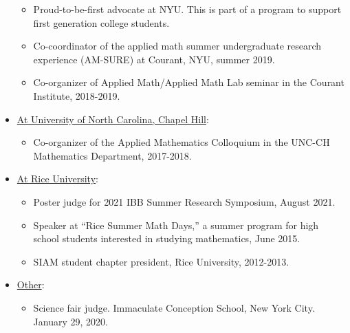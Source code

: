 \documentclass{article} %
\begin{document}
\begin{itemize}
\begin{itemize}
\item Proud-to-be-first advocate at NYU.  This is part of a program to support first generation college students.\item Co-coordinator of the applied math summer undergraduate research experience (AM-SURE) at Courant, NYU, summer 2019.
\item Co-organizer of Applied Math/Applied Math Lab seminar in the Courant Institute, 2018-2019.
\end{itemize}
\item \underline{At University of North Carolina, Chapel Hill}:
\begin{itemize}
\item Co-organizer of the Applied Mathematics Colloquium in the UNC-CH Mathematics Department, 2017-2018.
\end{itemize}
\item \underline{At Rice University}:
\begin{itemize}
\item Poster judge for 2021 IBB Summer Research Symposium, August 2021.
\item Speaker at ``Rice Summer Math Days,'' a summer program for high school students interested in studying mathematics, June 2015.
\item SIAM student chapter president, Rice University, 2012-2013.
\end{itemize}
\item \underline{Other}:
\begin{itemize}
\item Science fair judge.  Immaculate Conception School, New York City. January 29, 2020.
\end{itemize}
\end{itemize}
\end{document}
